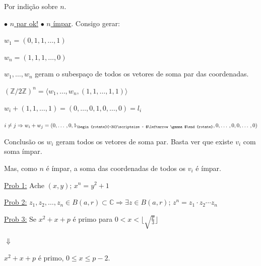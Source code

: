 \documentclass[a4paper,12pt]{article}
\renewcommand{\leq}{\ensuremath{\leqslant}}
\theoremstyle{plain} %
\theoremstyle{definition} %
\theoremstyle{remark} %
\newcommand{\rotsup}[1]{\begin{rotate}{-30}\scriptsize ~#1\end{rotate}}%
\begin{document}
	Por indi\c{c}\~ao sobre $n$.
	
	$\bullet$\hspace{1em} \underline{$n$ par ok!} $\bullet$\hspace{1em} \underline{$n$ \'impar}. Consigo gerar:
	
	$w_1=(0, 1, 1, \dotso, 1)$
	
	$w_n=(1, 1, 1, \dotso, 0)$
	
	$w_1, \dotso, w_n$ geram o subespa\c{c}o de todos os vetores de soma par das coordenadas.
	
	$(\mathds{Z}/2\mathds{Z})^n=\langle w_1, \dotso, w_n, (1, 1, \dotso, 1, 1)\rangle$
	
	\begin{center}
		$w_i+(1, 1, \dotso, 1)=(0, \dotso, 0, 1, 0, \dotso, 0)=l_i$
	\end{center}
	
	$i\neq j\Rightarrow w_i+w_j=(0, \dotso, 0, 1_{\rotsup{ $\leftarrow\gamma$}}, 0, \dotso, 0, 0, \dotso, 0)$
	
	Conclus\~ao os $w_i$ geram todos os vetores de soma par. 
	Basta ver que existe $v_i$ com soma \'impar.
	
	Mas, como $n$ \'e \'impar, a soma das coordenadas de todos os $v_i$ \'e \'impar. \tiny\textblock
	
	\normalsize
	
	\vspace{2ex}\underline{Prob 1:} Ache $(x,y)$; $x^n=y^2+1$
	
	\vspace{2ex}\underline{Prob 2:} $z_1, z_2, \dotso, z_n\in B(a, r) \subset \mathds{C}\Rightarrow \exists z\in B(a, r)$; $z^n=z_1\cdot z_2 \cdots z_n$
	
	\vspace{2ex}\underline{Prob 3:} Se $x^2+x+p$ \'e primo para $0<x<\lfloor \sqrt{\frac{p}{3}} \rfloor$
	
	\hspace{20em}$\Downarrow$
	
	\vspace{-1em}
	\begin{center}
		$x^2+x+p$ \'e primo, $0\leq x\leq p-2$.
	\end{center}
	
\end{document}

